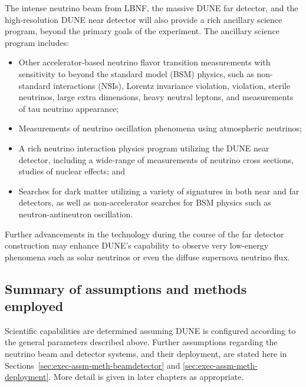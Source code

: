 The intense neutrino beam from LBNF, the massive DUNE \lartpc
far detector, and the high-resolution DUNE near detector will also
provide a rich ancillary science program, beyond the primary goals
of the experiment. The ancillary science program includes:
\begin{itemize}

\item Other accelerator-based neutrino flavor transition measurements with
      sensitivity to beyond the standard model (BSM) physics, such as non-standard
      interactions (NSIs), Lorentz invariance violation,  violation,
      sterile neutrinos, large extra dimensions, heavy neutral leptons,
      and measurements of tau neutrino appearance;

     \item Measurements of neutrino oscillation phenomena using atmospheric neutrinos;

     \item A rich neutrino interaction physics program utilizing the DUNE near detector,
           including a wide-range of measurements of neutrino cross sections, studies of
           nuclear effects; and

     \item Searches for dark matter utilizing a variety of
           signatures in both
           near and far detectors, as well as  
           non-accelerator searches for BSM physics 
           such as neutron-antineutron oscillation.

\end{itemize}

Further advancements in the \lartpc %
technology during the course of the far detector construction
may enhance DUNE's capability to observe very low-energy
phenomena such as solar neutrinos or even the diffuse
supernova neutrino flux.

\subsection{Summary of assumptions and methods employed}
\label{sec:exec-assm-meth}

Scientific capabilities are determined assuming DUNE
is configured according to the general parameters described above.
Further assumptions regarding the neutrino beam and detector 
systems, and their deployment, are stated here in
Sections~\ref{sec:exec-assm-meth-beamdetector} and
\ref{sec:exec-assm-meth-deployment}.  More detail is given
in later chapters as appropriate.

